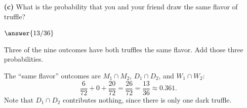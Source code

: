 \documentclass[12pt]{ximera}
\begin{document}
\begin{problem}
\begin{prompt}
\textbf{(c)} What is the probability that you and your friend draw the same flavor of
truffle?

$\answer{13/36}$

\begin{hint}
Three of the nine outcomes have both truffles the same flavor. Add those three
probabilities.
\end{hint}

\begin{feedback}
The ``same flavor'' outcomes are $M_1\cap M_2$, $D_1\cap D_2$, and $W_1\cap W_2$:
\[
\frac{6}{72} + 0 + \frac{20}{72} = \frac{26}{72} = \frac{13}{36} \approx 0.361.
\]
Note that $D_1\cap D_2$ contributes nothing, since there is only one dark truffle.
\end{feedback}
\end{prompt}
\end{problem}
\end{document}
